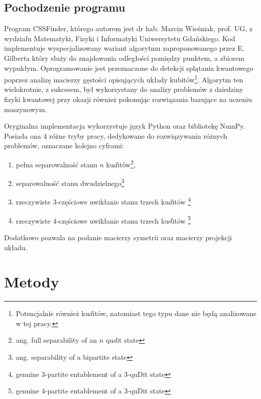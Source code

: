 \documentclass[10pt, a4paper]{article}
\begin{document}
\begin{sloppypar}
    \subsection{Pochodzenie programu}


    Program CSSFinder, którego autorem jest dr hab. Marcin Wieśniak, prof. UG, z wydziału
    Matematyki, Fizyki i Informatyki Uniwersytetu Gdańskiego. Kod implementuje wyspecjalizowany
    wariant algorytmu zaproponowanego przez E. Gilberta\cite{Lindemann_Gilbert} który służy
    do znajdowania odległości pomiędzy punktem, a zbiorem wypukłym. Oprogramowanie jest przeznaczone
    do detekcji splątania kwantowego\cite{MW_Hilbert_Schmidt_distance}\cite{MW_Variational_approach}\cite{MW_Gilbert_Quantum_Entanglement}
    poprzez analizę macierzy gęstości opisujących układy kubitów\footnote{Potencjalnie również
    ku$d$itów, natomiast tego typu dane nie będą analizowane w tej pracy.}. Algorytm ten
    wielokrotnie, z sukcesem, był wykorzystany do analizy problemów z dziedziny fizyki kwantowej\cite{MW_Hilbert_Schmidt_distance}
    przy okazji również pokonując rozwiązania bazujące na uczeniu maszynowym\cite{MW_56_Year_Algorithm}.

    Oryginalna implementacja wykorzystuje język Python oraz bibliotekę NumPy. Posiada
    ona 4 różne tryby pracy, dedykowane do rozwiązywania różnych problemów, oznaczane
    kolejno cyframi:

    \begin{enumerate}
      \item pełna separowalność stanu $n$ ku$d$itów\footnote{ang. full separability of an
        $n$ qu$d$it state},

      \item separowalność stanu dwudzielnego\footnote{ang. separability of a bipartite state}

      \item rzeczywiste 3-częściowe uwikłanie stanu trzech ku$d$itów \footnote{genuine 3-partite
        entablement of a 3-quDit state}

      \item rzeczywiste 4-częściowe uwikłanie stanu trzech ku$d$itów \footnote{genuine 4-partite
        entablement of a 3-quDit state}
    \end{enumerate}

    Dodatkowo pozwala na podanie macierzy symetrii oraz macierzy projekcji układu.

    \newpage


    \section{Metody}



\end{sloppypar}
\end{document}
